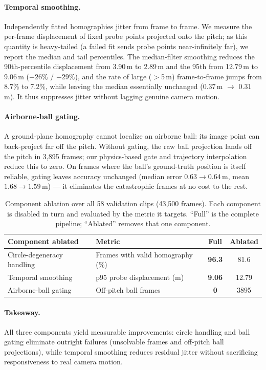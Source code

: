 \documentclass{article}
\begin{document}
\paragraph{Temporal smoothing.}
Independently fitted homographies jitter from frame to frame. We measure the
per-frame displacement of fixed probe points projected onto the pitch; as this
quantity is heavy-tailed (a failed fit sends probe points near-infinitely
far), we report the median and tail percentiles. The median-filter smoothing
reduces the 90th-percentile displacement from 3.90\,m to 2.89\,m and the 95th
from 12.79\,m to 9.06\,m ($-26\%$ / $-29\%$), and the rate of large
($>$5\,m) frame-to-frame jumps from 8.7\% to 7.2\%, while leaving the median
essentially unchanged (0.37\,m $\rightarrow$ 0.31\,m). It thus suppresses
jitter without lagging genuine camera motion.

\paragraph{Airborne-ball gating.}
A ground-plane homography cannot localize an airborne ball: its image point
can back-project far off the pitch. Without gating, the raw ball projection
lands off the pitch in 3{,}895 frames; our physics-based gate and trajectory
interpolation reduce this to zero. On frames where the ball's ground-truth
position is itself reliable, gating leaves accuracy unchanged (median error
$0.63 \rightarrow 0.64$\,m, mean $1.68 \rightarrow 1.59$\,m) --- it eliminates
the catastrophic frames at no cost to the rest.

\begin{table}[t]
  \caption{Component ablation over all 58 validation clips (43{,}500 frames).
    Each component is disabled in turn and evaluated by the metric it targets.
    ``Full'' is the complete pipeline; ``Ablated'' removes that one component.}
  \label{tab:exp2}
  \centering
  \begin{tabular}{llcc}
    \toprule
    Component ablated & Metric & Full & Ablated \\
    \midrule
    Circle-degeneracy handling & Frames with valid homography (\%) & \textbf{96.3} & 81.6 \\
    Temporal smoothing         & p95 probe displacement (m)        & \textbf{9.06} & 12.79 \\
    Airborne-ball gating       & Off-pitch ball frames             & \textbf{0}    & 3895 \\
    \bottomrule
  \end{tabular}
\end{table}

\paragraph{Takeaway.}
All three components yield measurable improvements: circle handling and ball
gating eliminate outright failures (unsolvable frames and off-pitch ball
projections), while temporal smoothing reduces residual jitter without
sacrificing responsiveness to real camera motion.
\end{document}
